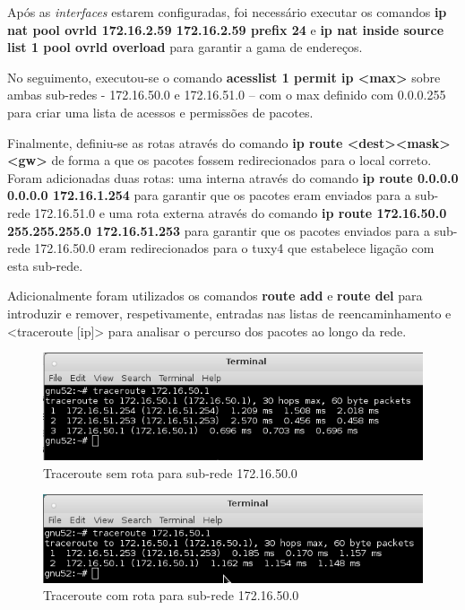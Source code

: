 \documentclass[a4paper, 11pt]{article}
\begin{document}
Após as \textit{interfaces} estarem configuradas, foi necessário executar os comandos \textbf{ip nat pool ovrld 172.16.2.59 172.16.2.59 prefix 24} e \textbf{ip nat inside source list 1 pool ovrld overload} para garantir a gama de endereços.

No seguimento, executou-se o comando \textbf{acesslist 1 permit ip  \textless max\textgreater} sobre ambas sub-redes - 172.16.50.0 e 172.16.51.0 – com o max definido com 0.0.0.255 para criar uma lista de acessos e permissões de pacotes.

Finalmente, definiu-se as rotas através do comando \textbf{ip route  \textless dest\textgreater  \textless mask\textgreater  \textless gw\textgreater} de forma a que os pacotes fossem redirecionados para o local correto. Foram adicionadas duas rotas: uma interna através do comando \textbf{ip route 0.0.0.0 0.0.0.0 172.16.1.254} para garantir que os pacotes eram enviados para a sub-rede 172.16.51.0 e uma rota externa através do comando \textbf{ip route 172.16.50.0 255.255.255.0 172.16.51.253} para garantir que os pacotes enviados para a sub-rede 172.16.50.0 eram redirecionados para o tuxy4 que estabelece ligação com esta sub-rede.

Adicionalmente foram utilizados os comandos   \textbf{route add} e   \textbf{ route del} para introduzir e remover, respetivamente, entradas nas listas de reencaminhamento e <traceroute [ip]> para analisar o percurso dos pacotes ao longo da rede.
\begin{figure}[h]
\centering
\includegraphics[scale=0.8]{images/Exp4_4traceroute.png}
\caption{Traceroute sem rota para sub-rede 172.16.50.0}
\label{Momentanpol}
\end{figure}
\begin{figure}[h]
\centering
\includegraphics[scale=0.8]{images/Exp4_4traceroute2.png}
\caption{Traceroute com rota para sub-rede 172.16.50.0}
\label{Momentanpol}
\end{figure}
\end{document}

